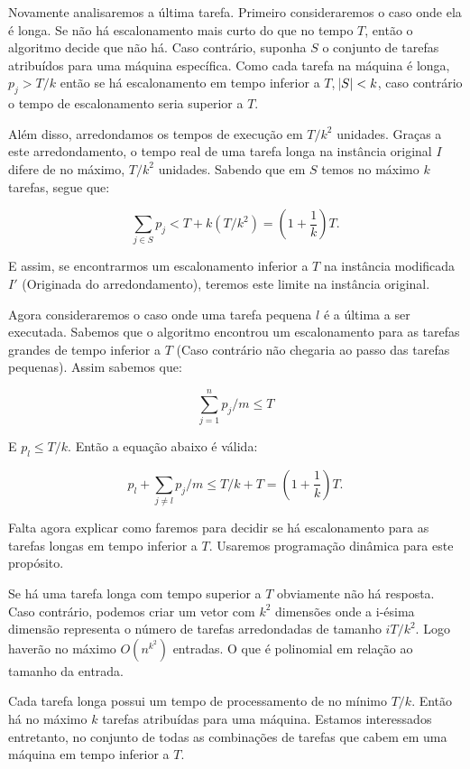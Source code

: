 Novamente analisaremos a última tarefa. Primeiro consideraremos o caso onde ela é longa. Se não há escalonamento mais curto do que no tempo $T$, então o algoritmo decide que não há. Caso contrário, suponha $S$ o conjunto de tarefas atribuídos para uma máquina específica. Como cada tarefa na máquina é longa, $p_j > T/k$ então se há escalonamento em tempo inferior a $T$, $\abs{S} < k$, caso contrário o tempo de escalonamento seria superior a $T$. 

Além disso, arredondamos os tempos de execução em $T/k^2$ unidades. Graças a este arredondamento, o tempo real de uma tarefa longa na instância original $I$ difere de no máximo, $T/k^2$ unidades. Sabendo que em $S$ temos no máximo $k$ tarefas, segue que:

\begin{equation}
\sum_{j \in S} p_j < T + k ( T / k^2) = \left(1 + \frac{1}{k}\right) T.
\end{equation}

E assim, se encontrarmos um escalonamento inferior a $T$ na instância modificada $I'$ (Originada do arredondamento), teremos este limite na instância original.

Agora consideraremos o caso onde uma tarefa pequena $l$ é a última a ser executada. Sabemos que o algoritmo encontrou um escalonamento para as tarefas grandes de tempo inferior a $T$ (Caso contrário não chegaria ao passo das tarefas pequenas). Assim sabemos que:

\begin{equation}
\sum_{j=1}^{n} p_j/m \leq T
\end{equation}

E $p_l \leq T / k$. Então a equação abaixo é válida:

\begin{equation}
p_l + \sum_{ j \neq l} p_j / m \leq T / k + T = \left(1 + \frac{1}{k}\right) T.
\end{equation}

Falta agora explicar como faremos para decidir se há escalonamento para as tarefas longas em tempo inferior a $T$. Usaremos programação dinâmica para este propósito. 

Se há uma tarefa longa com tempo superior a $T$ obviamente não há resposta. Caso contrário, podemos criar um vetor com $k^2$ dimensões onde a i-ésima dimensão representa o número de tarefas arredondadas de tamanho $iT/k^2$. Logo haverão no máximo $O(n^{k^2})$ entradas. O que é polinomial em relação ao tamanho da entrada.

Cada tarefa longa possui um tempo de processamento de no mínimo $T/k$. Então há no máximo $k$ tarefas atribuídas para uma máquina. Estamos interessados entretanto, no conjunto de todas as combinações de tarefas que cabem em uma máquina em tempo inferior a $T$. 

